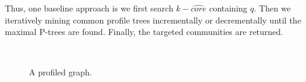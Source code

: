 Thus, one baseline approach is we first search $k-\widehat{core}$ containing $q$. Then we iteratively mining common profile trees incrementally or decrementally until the maximal P-trees are found. Finally, the targeted communities are returned. 

\begin{figure}[ht]
\label{pcqFigure}
    \centering
    \mbox{
        \hspace{0ex}
    }
    \caption{A profiled graph.}
\end{figure}

